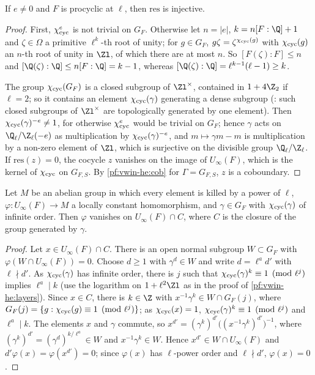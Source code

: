 \begin{lemma}[Injectivity]\label{pf:vwin-he:resinj}
If $e\ne0$ and $F$ is procyclic at $\ell$, then $\mathrm{res}$ is injective.
\end{lemma}

\begin{proof}
First, $\chi_{\mathrm{cyc}}^e$ is not trivial on $G_F$. Otherwise let $n=|e|$, $k=n[F:\Q]+1$ and $\zeta\in\Omega$ a primitive
$\ell^k$-th root of unity; for $g\in G_F$, $g\zeta=\zeta^{\chi_{\mathrm{cyc}}(g)}$ with $\chi_{\mathrm{cyc}}(g)$ an $n$-th root of unity
in $\Zl$, of which there are at most $n$. So $[F(\zeta):F]\le n$ and $[\Q(\zeta):\Q]\le n[F:\Q]=k-1$, whereas
$[\Q(\zeta):\Q]=\ell^{k-1}(\ell-1)\ge k$.

The group $\chi_{\mathrm{cyc}}(G_F)$ is a closed subgroup of $\Zl^\times$, contained in $1+4\Z_2$ if $\ell=2$; so it contains
an element $\chi_{\mathrm{cyc}}(\gamma)$ generating a dense subgroup (: such closed
subgroups of $\Zl^\times$ are topologically generated by one element). Then $\chi_{\mathrm{cyc}}(\gamma)^{-e}\ne1$, for
otherwise $\chi_{\mathrm{cyc}}^e$ would be trivial on $G_F$; hence $\gamma$ acts on $\vwinheQZ(-e)$ as multiplication by
$\chi_{\mathrm{cyc}}(\gamma)^{-e}$, and $m\mapsto\gamma m-m$ is multiplication by a non-zero element of $\Zl$, which is
surjective on the divisible group $\vwinheQZ$. If $\mathrm{res}(z)=0$, the cocycle $z$ vanishes on the image of
$U_\infty(F)$, which is the kernel of $\chi_{\mathrm{cyc}}$ on $G_{F,S}$. By \cref{pf:vwin-he:cob} for $\Gamma=G_{F,S}$, $z$ is a
coboundary.
\end{proof}

\begin{lemma}\label{pf:vwin-he:vanish}
Let $M$ be an abelian group in which every element is killed by a power of $\ell$, $\varphi:U_\infty(F)\to M$ a
locally constant homomorphism, and $\gamma\in G_F$ with $\chi_{\mathrm{cyc}}(\gamma)$ of infinite order. Then $\varphi$ vanishes
on $U_\infty(F)\cap C$, where $C$ is the closure of the group generated by $\gamma$.
\end{lemma}

\begin{proof}
Let $x\in U_\infty(F)\cap C$. There is an open normal subgroup $W\subset G_F$ with $\varphi(W\cap U_\infty(F))=0$.
Choose $d\ge1$ with $\gamma^d\in W$ and write $d=\ell^ad'$ with $\ell\nmid d'$. As $\chi_{\mathrm{cyc}}(\gamma)$ has infinite
order, there is $j$ such that $\chi_{\mathrm{cyc}}(\gamma)^k\equiv1\pmod{\ell^j}$ implies $\ell^a\mid k$ (use the logarithm
on $1+\ell^2\Zl$ as in the proof of \cref{pf:vwin-he:layers}). Since $x\in C$, there is $k\in\Z$ with
$x^{-1}\gamma^k\in W\cap G_F(j)$, where $G_F(j)=\{g:\chi_{\mathrm{cyc}}(g)\equiv1\pmod{\ell^j}\}$; as $\chi_{\mathrm{cyc}}(x)=1$,
$\chi_{\mathrm{cyc}}(\gamma)^k\equiv1\pmod{\ell^j}$ and $\ell^a\mid k$. The elements $x$ and $\gamma$ commute, so
$x^{d'}=(\gamma^k)^{d'}\bigl((x^{-1}\gamma^k)^{d'}\bigr)^{-1}$, where $(\gamma^k)^{d'}=(\gamma^d)^{k/\ell^a}\in W$ and
$x^{-1}\gamma^k\in W$. Hence $x^{d'}\in W\cap U_\infty(F)$ and $d'\varphi(x)=\varphi(x^{d'})=0$; since $\varphi(x)$ has
$\ell$-power order and $\ell\nmid d'$, $\varphi(x)=0$.
\end{proof}

